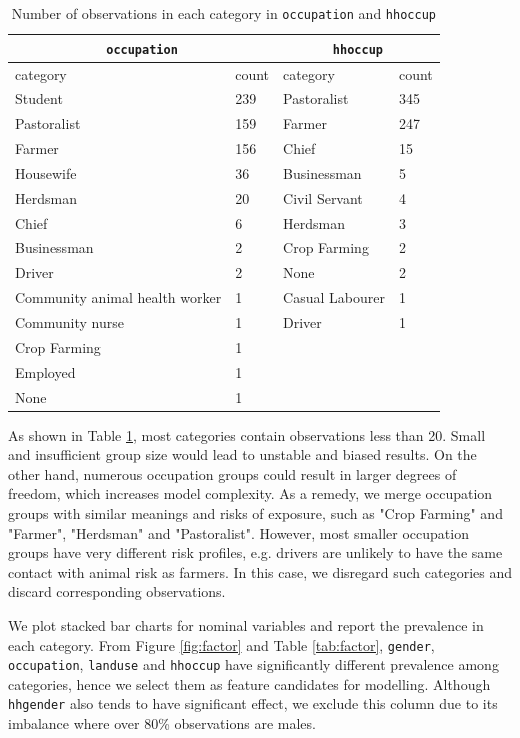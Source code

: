 \documentclass[11pt,twoside]{article}
\numberwithin{Theorem}{section}
\numberwithin{Definition}{section}
\numberwithin{Lemma}{section}
\numberwithin{Algorithm}{section}
\numberwithin{equation}{section}
\begin{document}
\begin{table}[!h]
	\centering
	\begin{tabular}{|l|l|l|l|}
		\hline
		\multicolumn{2}{|c|}{\texttt{occupation}} & \multicolumn{2}{|c|}{\texttt{hhoccup}} \\
		\hline
		category & 	count & category & count \\
		\hline
		Student & 239 & Pastoralist & 345 \\				
		Pastoralist & 159 & Farmer & 247 \\
		Farmer & 156 & Chief & 15 \\
		Housewife & 36	& Businessman & 5 \\			
		Herdsman & 20 & Civil Servant & 4 \\	
		Chief & 6 & Herdsman & 3 \\	
		Businessman & 2 & Crop Farming & 2 \\
		Driver & 2 & None & 2 \\
		Community animal health worker & 1 & Casual Labourer & 1 \\			
		Community nurse & 1	& Driver & 1 \\	
		Crop Farming & 1 & & \\			
		Employed & 1 & & \\
		None & 1 & & \\
		\hline
	\end{tabular}	
	\caption{Number of observations in each category in \texttt{occupation} and \texttt{hhoccup}}
	\label{tab:occ}
\end{table}

 As shown in Table \ref{tab:occ}, most categories contain observations less than 20. Small and insufficient group size would lead to unstable and biased results. On the other hand, numerous occupation groups could result in larger degrees of freedom, which increases model complexity. As a remedy, we merge occupation groups with similar meanings and risks of exposure, such as "Crop Farming" and "Farmer", "Herdsman" and "Pastoralist". However, most smaller occupation groups have very different risk profiles, e.g. drivers are unlikely to have the same contact with animal risk as farmers. In this case, we disregard such categories and discard corresponding observations.

We plot stacked bar charts for nominal variables and report the prevalence in each category. From Figure \ref{fig:factor} and Table \ref{tab:factor}, \texttt{gender},  \texttt{occupation}, \texttt{landuse} and \texttt{hhoccup} have significantly different prevalence among categories, hence we select them as feature candidates for modelling. Although \texttt{hhgender} also tends to have significant effect, we exclude this column due to its imbalance where over 80\% observations are males.
\end{document}
